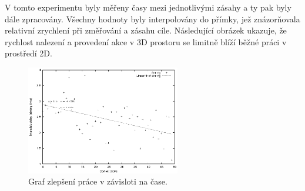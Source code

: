 V tomto experimentu byly měřeny časy mezi jednotlivými zásahy a ty pak byly dále zpracovány. Všechny hodnoty byly interpolovány do přímky, jež znázorňovala relativní zrychlení při změřování a zásahu cíle. Následující obrázek ukazuje, že rychlost nalezení a provedení akce v 3D prostoru se limitně blíží běžné práci v prostředí 2D.

\begin{figure}[htb]
\centering
\includegraphics[width=0.6\textwidth]{img/aiming_time_progress.eps}
\caption{Graf zlepšení práce v závisloti na čase.}
\label{fig:basicidea}
\end{figure}

